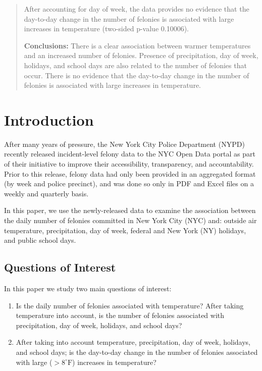 \documentclass[11pt,notitlepage]{article}
\newcommand{\degf}{^\circ\text{F}}
\begin{document}
\begin{abstract}
After accounting for day of week, the data provides no evidence that the day-to-day change in the number of felonies is associated with large increases in temperature (two-sided p-value 0.10006).

\noindent \textbf{Conclusions:} There is a clear association between warmer temperatures and an increased number of felonies. Presence of precipitation, day of week, holidays, and school days are also related to the number of felonies that occur. There is no evidence that the day-to-day change in the number of felonies is associated with large increases in temperature.




\end{abstract}


\pagebreak


\section{Introduction}



After many years of pressure, the New York City Police Department (NYPD) recently released incident-level felony data to the NYC Open Data portal as part of their initiative to improve their accessibility, transparency, and accountability. Prior to this release, felony data had only been provided in an aggregated format (by week and police precinct), and was done so only in PDF and Excel files on a weekly and quarterly basis.

In this paper, we use the newly-released data to examine the association between the daily number of felonies committed in New York City (NYC) and: outside air temperature, precipitation, day of week, federal and New York (NY) holidays, and public school days.

\subsection{Questions of Interest}

In this paper we study two main questions of interest:

\begin{enumerate}
\setlength\itemsep{-3pt}
\vspace*{-3mm}

\item Is the daily number of felonies associated with temperature? After taking temperature into account, is the number of felonies associated with precipitation, day of week, holidays, and school days?
\item After taking into account temperature, precipitation, day of week, holidays, and school days; is the day-to-day change in the number of felonies associated with large ($>8 \degf$) increases in temperature?

\vspace*{-3mm}
\end{enumerate}
\end{document}
